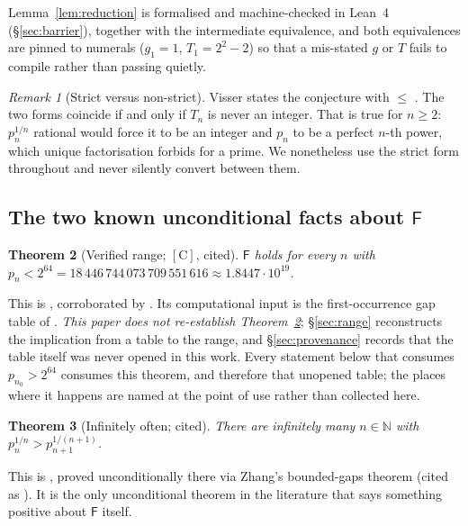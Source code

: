 \documentclass[11pt,a4paper]{article}
\theoremstyle{plain}
\newtheorem{theorem}{Theorem}[section]
\theoremstyle{definition}
\theoremstyle{remark}
\newtheorem{remark}[theorem]{Remark}
\newcommand{\cC}{{[\mathrm{C}]}}
\newcommand{\N}{\mathbb{N}}
\newcommand{\Fb}{\mathsf{F}}
\begin{document}
Lemma~\ref{lem:reduction} is formalised and machine-checked in Lean~4
(\S\ref{sec:barrier}), together with the intermediate equivalence, and both equivalences are
pinned to numerals ($g_1 = 1$, $T_1 = 2^2 - 2$) so that a mis-stated $g$ or $T$ fails to
compile rather than passing quietly.

\begin{remark}[Strict versus non-strict]
\label{rem:strict}
Visser states the conjecture with $\le$ \cite[Conj.~3, eq.~(2.4)]{visser2019verifying}. The
two forms coincide if and only if $T_n$ is never an integer. That is true for $n \ge 2$:
$p_n^{1/n}$ rational would force it to be an integer and $p_n$ to be a perfect $n$-th power,
which unique factorisation forbids for a prime. We nonetheless use the strict form
throughout and never silently convert between them.
\end{remark}

\subsection{The two known unconditional facts about $\Fb$}

\begin{theorem}[Verified range; $\cC$, cited]
\label{thm:verified}
$\Fb$ holds for every $n$ with
$p_n < 2^{64} = 18\,446\,744\,073\,709\,551\,616 \approx 1.8447\cdot10^{19}$.
\end{theorem}

This is \cite[endnotes, 5 Jan 2023]{kourbatov2015verification}, corroborated by
\cite[Abstract, \S1 eq.~(1.4)]{visser2019verifying}. Its computational input is the
first-occurrence gap table of \cite{oliveira2014goldbach}. \emph{This paper does not
re-establish Theorem~\ref{thm:verified}}; \S\ref{sec:range} reconstructs the implication
from a table to the range, and \S\ref{sec:provenance} records that the table itself was never
opened in this work. Every statement below that consumes $p_{n_0} > 2^{64}$ consumes this
theorem, and therefore that unopened table; the places where it happens are named at the point
of use rather than collected here.

\begin{theorem}[Infinitely often; cited]
\label{thm:io}
There are infinitely many $n \in \N$ with $p_n^{1/n} > p_{n+1}^{1/(n+1)}$.
\end{theorem}

This is \cite[Thm.~5.2]{ferreira2017consequences}, proved unconditionally there via Zhang's
bounded-gaps theorem (cited as \cite[Thm.~5.1]{ferreira2017consequences}). It is the only
unconditional theorem in the literature that says something positive about $\Fb$ itself.
\end{document}

